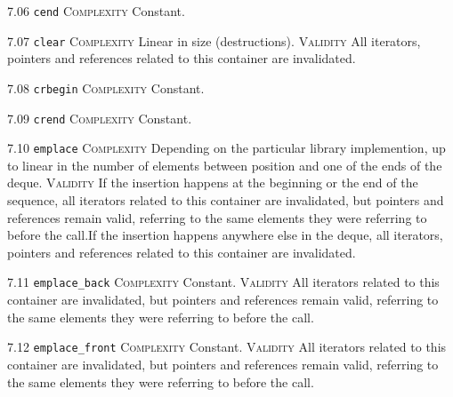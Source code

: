 \noindent\textcolor{cgreen}{7.06 \texttt{cend}} \textsc{Complexity} Constant. \vspace{0.5em}

\noindent\textcolor{corange}{7.07 \texttt{clear}} \textsc{Complexity} Linear in size (destructions). \textsc{Validity} All iterators, pointers and references related to this container are invalidated.\vspace{0.5em}

\noindent\textcolor{cgreen}{7.08 \texttt{crbegin}} \textsc{Complexity} Constant. \vspace{0.5em}

\noindent\textcolor{cgreen}{7.09 \texttt{crend}} \textsc{Complexity} Constant. \vspace{0.5em}

\noindent\textcolor{corange}{7.10 \texttt{emplace}} \textsc{Complexity} Depending on the particular library implemention, up to linear in the number of elements between position and one of the ends of the deque. \textsc{Validity} If the insertion happens at the beginning or the end of the sequence, all iterators related to this container are invalidated, but pointers and references remain valid, referring to the same elements they were referring to before the call.If the insertion happens anywhere else in the deque, all iterators, pointers and references related to this container are invalidated.\vspace{0.5em}

\noindent\textcolor{cgreen}{7.11 \texttt{emplace\_back}} \textsc{Complexity} Constant. \textsc{Validity} All iterators related to this container are invalidated, but pointers and references remain valid, referring to the same elements they were referring to before the call.\vspace{0.5em}

\noindent\textcolor{cgreen}{7.12 \texttt{emplace\_front}} \textsc{Complexity} Constant. \textsc{Validity} All iterators related to this container are invalidated, but pointers and references remain valid, referring to the same elements they were referring to before the call.\vspace{0.5em}


